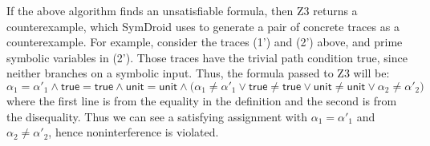 \documentclass{llncs}
\newcommand{\code}[1]{\textsf{#1}} %
\newcommand{\sfmt}[1]{\textsf{#1}}
\newcommand{\sunit}{\sfmt{unit}}
\begin{document}

If the above algorithm finds an unsatisfiable formula, then Z3 returns a counterexample, which
SymDroid uses to generate a pair of concrete traces
as a counterexample.
For example, consider the traces (1') and (2') above, and prime
symbolic variables in (2'). Those traces have the trivial path
condition \sfmt{true}, since neither branches on a symbolic
input. Thus, the formula passed to Z3 will be:
\begin{displaymath}
    \alpha_1 = \alpha'_1 \land \code{true} = \code{true} \land \sunit = \sunit
    \land
    \big(\alpha_1 \neq \alpha'_1 \vee \code{true} \neq \code{true} \vee
    \sunit \neq \sunit \vee \alpha_2 \neq \alpha'_2 \big)
\end{displaymath}
where the first line is from the equality in the definition and the
second is from the disequality. Thus we can see a satisfying
assignment with $\alpha_1 = \alpha'_1$ and $\alpha_2 \neq \alpha'_2$,
hence noninterference is violated.





\end{document}
